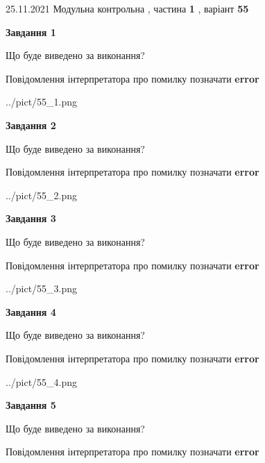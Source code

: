 \documentclass[10pt, ukrainian]{article}
\begin{document}
{25.11.2021 Модульна контрольна , частина \textbf { 1 }, варіант  \No \textbf { 55 }\par}
{
\begin {large}

{\begin {center}\textbf{Завдання 1}\end {center}}\par
Що буде виведено за виконання? \par
Повідомлення інтерпретатора про помилку позначати \textbf{error}

\begin{center}
	{../pict/55_1.png}
\end{center}
\newpage

{\begin {center}\textbf{Завдання 2}\end {center}}\par
Що буде виведено за виконання? \par
Повідомлення інтерпретатора про помилку позначати \textbf{error}

\begin{center}
	{../pict/55_2.png}
\end{center}
\newpage

{\begin {center}\textbf{Завдання 3}\end {center}}\par
Що буде виведено за виконання? \par
Повідомлення інтерпретатора про помилку позначати \textbf{error}

\begin{center}
	{../pict/55_3.png}
\end{center}
\newpage

{\begin {center}\textbf{Завдання 4}\end {center}}\par
Що буде виведено за виконання? \par
Повідомлення інтерпретатора про помилку позначати \textbf{error}

\begin{center}
	{../pict/55_4.png}
\end{center}
\newpage

{\begin {center}\textbf{Завдання 5}\end {center}}\par
Що буде виведено за виконання? \par
Повідомлення інтерпретатора про помилку позначати \textbf{error}


\end{large}}
\end{document}
